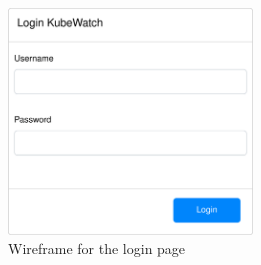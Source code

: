 \begin{figure}[h]
  \centering
  \caption{\label{fig:wireframe-login}Wireframe for the login page}
  \includegraphics[height=6cm]{resources/wireframe_kubewatch-Login.png}
\end{figure}